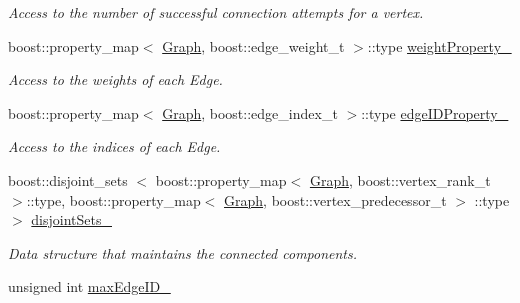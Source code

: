 \begin{DoxyCompactItemize}
\begin{DoxyCompactList}\small\item\em \-Access to the number of successful connection attempts for a vertex. \end{DoxyCompactList}\item 
\hypertarget{class_f_i_r_m_aebe2eb302b9af9ced9bc26f03d369297}{boost\-::property\-\_\-map$<$ \hyperlink{class_f_i_r_m_a687e9f4243b22c30ee1fa5da22a85053}{\-Graph}, \*
boost\-::edge\-\_\-weight\-\_\-t $>$\-::type \hyperlink{class_f_i_r_m_aebe2eb302b9af9ced9bc26f03d369297}{weight\-Property\-\_\-}}\label{class_f_i_r_m_aebe2eb302b9af9ced9bc26f03d369297}

\begin{DoxyCompactList}\small\item\em \-Access to the weights of each \-Edge. \end{DoxyCompactList}\item 
\hypertarget{class_f_i_r_m_a81eba4eb39bce397127a9d41cf0b5cd2}{boost\-::property\-\_\-map$<$ \hyperlink{class_f_i_r_m_a687e9f4243b22c30ee1fa5da22a85053}{\-Graph}, \*
boost\-::edge\-\_\-index\-\_\-t $>$\-::type \hyperlink{class_f_i_r_m_a81eba4eb39bce397127a9d41cf0b5cd2}{edge\-I\-D\-Property\-\_\-}}\label{class_f_i_r_m_a81eba4eb39bce397127a9d41cf0b5cd2}

\begin{DoxyCompactList}\small\item\em \-Access to the indices of each \-Edge. \end{DoxyCompactList}\item 
\hypertarget{class_f_i_r_m_adbe52d3e291fc164ff9338765534e7ce}{boost\-::disjoint\-\_\-sets\*
$<$ boost\-::property\-\_\-map$<$ \hyperlink{class_f_i_r_m_a687e9f4243b22c30ee1fa5da22a85053}{\-Graph}, \*
boost\-::vertex\-\_\-rank\-\_\-t $>$\-::type, \*
boost\-::property\-\_\-map$<$ \hyperlink{class_f_i_r_m_a687e9f4243b22c30ee1fa5da22a85053}{\-Graph}, \*
boost\-::vertex\-\_\-predecessor\-\_\-t $>$\*
\-::type $>$ \hyperlink{class_f_i_r_m_adbe52d3e291fc164ff9338765534e7ce}{disjoint\-Sets\-\_\-}}\label{class_f_i_r_m_adbe52d3e291fc164ff9338765534e7ce}

\begin{DoxyCompactList}\small\item\em \-Data structure that maintains the connected components. \end{DoxyCompactList}\item 
\hypertarget{class_f_i_r_m_a517174c1ae349153df76f81f2ba2b2f1}{unsigned int \hyperlink{class_f_i_r_m_a517174c1ae349153df76f81f2ba2b2f1}{max\-Edge\-I\-D\-\_\-}}\label{class_f_i_r_m_a517174c1ae349153df76f81f2ba2b2f1}


\end{DoxyCompactItemize}
